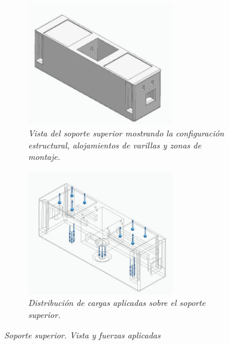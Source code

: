 \begin{figure}[H]
    \centering
    \begin{subfigure}{0.35\textwidth}
        \centering
        \includegraphics[width=0.7\textwidth]{img/SuperiorReal_simplificado_vista.jpg}
        \caption{\textit{Vista del soporte superior mostrando la configuración estructural, alojamientos de varillas y zonas de montaje.}}
        \label{fig:SuperiorReal_simplificado_vista}
    \end{subfigure}
    \hspace{0.5cm}
    \begin{subfigure}{0.35\textwidth}
        \centering
        \includegraphics[width=0.7\textwidth]{img/SuperiorReal_simplificado_fuerzas_app.jpg}
        \caption{\textit{Distribución de cargas aplicadas sobre el soporte superior.}}
        \label{fig:SuperiorReal_simplificado_fuerzas_app}
    \end{subfigure}
    \caption{\textit{Soporte superior. Vista y fuerzas aplicadas}}
\end{figure}

